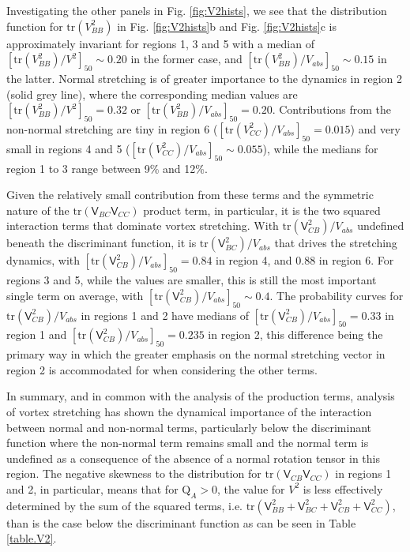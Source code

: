 \documentclass[preprint,amssymb,amsmath,aip,cha]{revtex4-1}
\begin{document}
Investigating the other panels in Fig. \ref{fig:V2hists}, we see that the distribution function for $\mbox{tr}(V_{BB}^{2})$ in Fig. \ref{fig:V2hists}b and Fig. \ref{fig:V2hists}c is approximately invariant for regions 1, 3 and 5 with a median of $[\mbox{tr}(V_{BB}^{2})/V^{2}]_{50} \sim 0.20$ in the former case, and $[\mbox{tr}(V_{BB}^{2})/V_{abs}]_{50} \sim 0.15$ in the latter. Normal stretching is of greater importance to the dynamics in region 2 (solid grey line), where the corresponding median values are $[\mbox{tr}(V_{BB}^{2})/V^{2}]_{50} = 0.32$ or $[\mbox{tr}(V_{BB}^{2})/V_{abs}]_{50} = 0.20$. Contributions from the non-normal stretching are tiny in region 6 ($[\mbox{tr}(V_{CC}^{2})/V_{abs}]_{50} = 0.015$) and very small in regions 4 and 5 ($[\mbox{tr}(V_{CC}^{2})/V_{abs}]_{50} \sim 0.055$), while the medians for region 1 to 3 range between 9\% and 12\%. 

Given the relatively small contribution from these terms and the symmetric nature of the $\mbox{tr}(\mathsf{V}_{BC}\mathsf{V}_{CC})$ product term, in particular, it is the two squared interaction terms that dominate vortex stretching. With $\mbox{tr}(\mathsf{V}_{CB}^{2})/V_{abs}$ undefined beneath the discriminant function, it is $\mbox{tr}(\mathsf{V}_{BC}^{2})/V_{abs}$ that drives the stretching dynamics, with $[\mbox{tr}(\mathsf{V}_{CB}^{2})/V_{abs}]_{50} = 0.84$ in region 4, and 0.88 in region 6. For regions 3 and 5, while the values are smaller, this is still the most important single term on average, with $[\mbox{tr}(\mathsf{V}_{CB}^{2})/V_{abs}]_{50} \sim 0.4$. The probability curves for $\mbox{tr}(\mathsf{V}_{CB}^{2})/V_{abs}$ in regions 1 and 2 have medians of $[\mbox{tr}(\mathsf{V}_{CB}^{2})/V_{abs}]_{50} = 0.33$ in region 1 and $[\mbox{tr}(\mathsf{V}_{CB}^{2})/V_{abs}]_{50} = 0.235$ in region 2, this difference being the primary way in which the greater emphasis on the normal stretching vector in region 2 is accommodated for when considering the other terms.

In summary, and in common with the analysis of the production terms, analysis of vortex stretching has shown the dynamical importance of the interaction between normal and non-normal terms, particularly below the discriminant function where the non-normal term remains small and the normal term is undefined as a consequence of the absence of a normal rotation tensor in this region. The negative skewness to the distribution for $\mbox{tr}(\mathsf{V}_{CB}\mathsf{V}_{CC})$ in regions 1 and 2, in particular, means that for $\mbox{Q}_{A} > 0$, the value for $V^{2}$ is less effectively determined by the sum of the squared terms, i.e. $\mbox{tr}(\mathsf{V}_{BB}^{2} + \mathsf{V}_{BC}^{2} + \mathsf{V}_{CB}^{2} + \mathsf{V}_{CC}^{2})$, than is the case below the discriminant function as can be seen in Table \ref{table.V2}.
\end{document}
